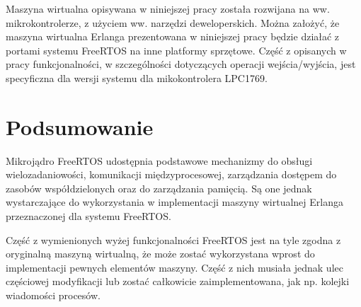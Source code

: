 Maszyna wirtualna opisywana w niniejszej pracy została rozwijana na ww. mikrokontrolerze, z użyciem ww. narzędzi deweloperskich. Można założyć, że maszyna wirtualna Erlanga prezentowana w niniejszej pracy będzie działać z portami systemu FreeRTOS na inne platformy sprzętowe. Część z opisanych w pracy funkcjonalności, w szczególności dotyczących operacji wejścia/wyjścia, jest specyficzna dla wersji systemu dla mikokontrolera LPC1769.

\section{Podsumowanie}
\label{sec:rtosPodsumowanie}

Mikrojądro FreeRTOS udostępnia podstawowe mechanizmy do obsługi wielozadaniowości, komunikacji międzyprocesowej, zarządzania dostępem do zasobów współdzielonych oraz do zarządzania pamięcią. Są one jednak wystarczające do wykorzystania w implementacji maszyny wirtualnej Erlanga przeznaczonej dla systemu FreeRTOS.

Część z wymienionych wyżej funkcjonalności FreeRTOS jest na tyle zgodna z oryginalną maszyną wirtualną, że może zostać wykorzystana wprost do implementacji pewnych elementów maszyny. Część z nich musiała jednak ulec częściowej modyfikacji lub zostać całkowicie zaimplementowana, jak np. kolejki wiadomości procesów. 